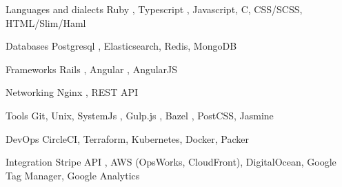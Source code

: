 

\begin{cvskills}

  \cvskill
    {Languages and dialects} %
    {Ruby {\color{awesome-mustard} \faStar}, Typescript {\color{awesome-mustard} \faStar}, Javascript, C, CSS/SCSS, HTML/Slim/Haml} %

  \cvskill
    {Databases} %
    {Postgresql {\color{awesome-mustard} \faStar}, Elasticsearch, Redis, MongoDB} %

  \cvskill
    {Frameworks} %
    {Rails {\color{awesome-mustard} \faStar}, Angular {\color{awesome-mustard} \faStar}, AngularJS} %

  \cvskill
    {Networking} %
    {Nginx {\color{awesome-mustard} \faStar}, REST API {\color{awesome-mustard} \faStar}} %

  \cvskill
    {Tools} %
    {Git, Unix, SystemJs {\color{awesome-mustard} \faStar}, Gulp.js {\color{awesome-mustard} \faStar}, Bazel {\color{awesome-mustard} \faStar}, PostCSS, Jasmine} %

  \cvskill
    {DevOps} %
    {CircleCI, Terraform, Kubernetes, Docker, Packer} %


  \cvskill
    {Integration} %
    {Stripe API {\color{awesome-mustard} \faStar}, AWS (OpsWorks, CloudFront), DigitalOcean, Google Tag Manager, Google Analytics} %


\end{cvskills}
